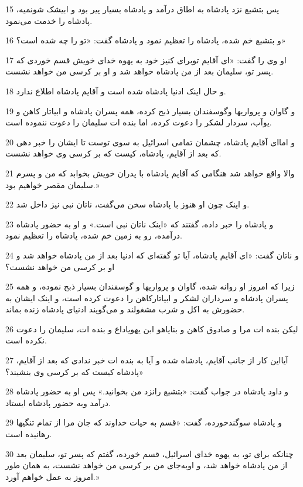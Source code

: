 \par 15 پس بتشبع نزد پادشاه به اطاق درآمد و پادشاه بسیار پیر بود و ابیشک شونمیه، پادشاه را خدمت می‌نمود.
\par 16 و بتشبع خم شده، پادشاه را تعظیم نمود و پادشاه گفت: «تو را چه شده است؟»
\par 17 او وی را گفت: «ای آقایم توبرای کنیز خود به یهوه خدای خویش قسم خوردی که پسر تو، سلیمان بعد از من پادشاه خواهد شد و او بر کرسی من خواهد نشست.
\par 18 و حال اینک ادنیا پادشاه شده است و آقایم پادشاه اطلاع ندارد.
\par 19 و گاوان و پرواریها وگوسفندان بسیار ذبح کرده، همه پسران پادشاه و ابیاتار کاهن و یوآب، سردار لشکر را دعوت کرده، اما بنده ات سلیمان را دعوت ننموده است.
\par 20 و اما‌ای آقایم پادشاه، چشمان تمامی اسرائیل به سوی توست تا ایشان را خبر دهی که بعد از آقایم، پادشاه، کیست که بر کرسی وی خواهد نشست.
\par 21 والا واقع خواهد شد هنگامی که آقایم پادشاه با پدران خویش بخوابد که من و پسرم سلیمان مقصر خواهیم بود.»
\par 22 و اینک چون او هنوز با پادشاه سخن می‌گفت، ناتان نبی نیز داخل شد.
\par 23 و پادشاه را خبر داده، گفتند که «اینک ناتان نبی است.» و او به حضور پادشاه درآمده، رو به زمین خم شده، پادشاه را تعظیم نمود.
\par 24 و ناتان گفت: «ای آقایم پادشاه، آیا تو گفته‌ای که ادنیا بعد از من پادشاه خواهد شد و او بر کرسی من خواهد نشست؟
\par 25 زیرا که امروز او روانه شده، گاوان و پرواریها و گوسفندان بسیار ذبح نموده، و همه پسران پادشاه و سرداران لشکر و ابیاتارکاهن را دعوت کرده است، و اینک ایشان به حضورش به اکل و شرب مشغولند و می‌گویند ادنیای پادشاه زنده بماند.
\par 26 لیکن بنده ات مرا و صادوق کاهن و بنایاهو ابن یهویاداع و بنده ات، سلیمان را دعوت نکرده است.
\par 27 آیااین کار از جانب آقایم، پادشاه شده و آیا به بنده ات خبر ندادی که بعد از آقایم، پادشاه کیست که بر کرسی وی بنشیند؟»
\par 28 و داود پادشاه در جواب گفت: «بتشبع رانزد من بخوانید.» پس او به حضور پادشاه درآمد وبه حضور پادشاه ایستاد.
\par 29 و پادشاه سوگندخورده، گفت: «قسم به حیات خداوند که جان مرا از تمام تنگیها رهانیده است.
\par 30 چنانکه برای تو، به یهوه خدای اسرائیل، قسم خورده، گفتم که پسر تو، سلیمان بعد از من پادشاه خواهد شد، و اوبه‌جای من بر کرسی من خواهد نشست، به همان طور امروز به عمل خواهم آورد.»
